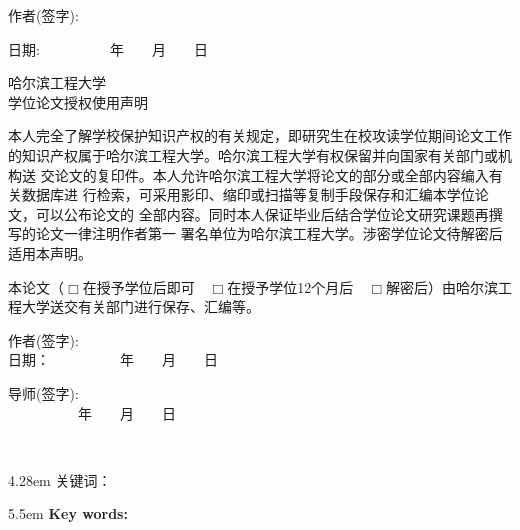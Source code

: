 {\begin{titlepage}
    \hfill 作者(签字):~~~~~~~~~~~~~~~~~~~~~~~~~~~~~~~
    
    \hfill 日期:~~~~~~~~~~年~~~~月~~~~日
    
    \begin{center}
    	\heiti  \xiaosan 哈尔滨工程大学\\
    	学位论文授权使用声明
    \end{center}
    
    本人完全了解学校保护知识产权的有关规定，即研究生在校攻读学位期间论文工作
    的知识产权属于哈尔滨工程大学。哈尔滨工程大学有权保留并向国家有关部门或机构送
    交论文的复印件。本人允许哈尔滨工程大学将论文的部分或全部内容编入有关数据库进
    行检索，可采用影印、缩印或扫描等复制手段保存和汇编本学位论文，可以公布论文的
    全部内容。同时本人保证毕业后结合学位论文研究课题再撰写的论文一律注明作者第一
    署名单位为哈尔滨工程大学。涉密学位论文待解密后适用本声明。
    
    本论文（$\Box$在授予学位后即可~~$\Box$在授予学位12个月后~~$\Box$解密后）由哈尔滨工
    程大学送交有关部门进行保存、汇编等。
    
    \parbox[t][0.8cm][t]{7cm}{作者(签字):\\日期：~~~~~~~~~~年~~~~月~~~~日}
    \parbox[t][0.8cm][t]{7cm}{导师(签字):\\~~~~~~~~~~年~~~~月~~~~日}
    
\fi

    \end{titlepage}

  \ifoneortwoside
    \newpage
    ~~~\vspace{1em}
    \thispagestyle{empty}
  \fi
\clearpage {}
\setcounter{page}{1}
\song \normalsize
{}
\@cabstract
\vspace{1.6em}

\hangindent4.28em\noindent
{\hei 关键词：} \@ckeywords

\clearpage
 {}  %
\@eabstract
\vspace{1.6em}

\hangindent5.5em\noindent
{\textbf{Key words:}}  \@ekeywords
\wuhaobiao  %
}

